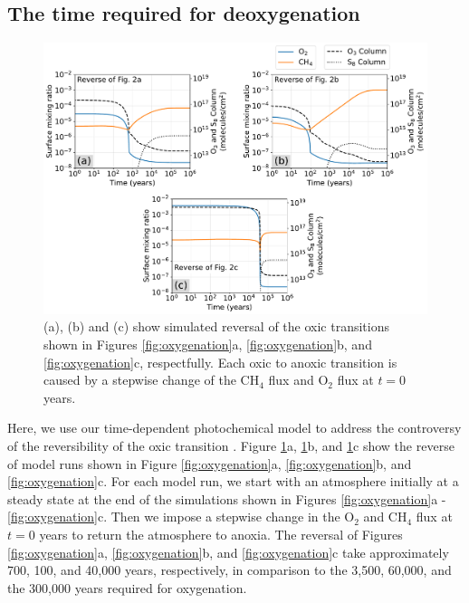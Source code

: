 \subsection{The time required for deoxygenation} \label{sec:deoxygenation}

\begin{figure}
  \centering
  \includegraphics[width=\textwidth]{tex/4goe/main/Reversibility.pdf}
  \caption{(a), (b) and (c) show simulated reversal of the oxic transitions shown in Figures \ref{fig:oxygenation}a, \ref{fig:oxygenation}b, and \ref{fig:oxygenation}c, respectfully. Each oxic to anoxic transition is caused by a stepwise change of the CH$_4$ flux and O$_2$ flux at $t=0$ years.}
  \label{fig:reverse}
\end{figure}

Here, we use our time-dependent photochemical model to address the controversy of the reversibility of the oxic transition \citep{Poulton_2021, Izon_2022}. Figure \ref{fig:reverse}a, \ref{fig:reverse}b, and \ref{fig:reverse}c show the reverse of model runs shown in Figure \ref{fig:oxygenation}a, \ref{fig:oxygenation}b, and  \ref{fig:oxygenation}c. For each model run, we start with an atmosphere initially at a steady state at the end of the simulations shown in Figures \ref{fig:oxygenation}a - \ref{fig:oxygenation}c. Then we impose a stepwise change in the O$_2$ and CH$_4$ flux at $t = 0$ years to return the atmosphere to anoxia. The reversal of Figures \ref{fig:oxygenation}a, \ref{fig:oxygenation}b, and \ref{fig:oxygenation}c take approximately 700, 100, and 40,000 years, respectively, in comparison to the 3,500, 60,000, and the 300,000 years required for oxygenation.

